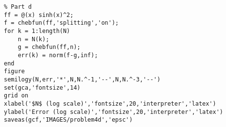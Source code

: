 \begin{solution}
\begin{verbatim}
% Part d
ff = @(x) sinh(x)^2;
f = chebfun(ff,'splitting','on');
for k = 1:length(N)
    n = N(k);
    g = chebfun(ff,n);
    err(k) = norm(f-g,inf);
end
figure
semilogy(N,err,'*',N,N.^-1,'--',N,N.^-3,'--')
set(gca,'fontsize',14)
grid on
xlabel('$N$ (log scale)','fontsize',20,'interpreter','latex')
ylabel('Error (log scale)','fontsize',20,'interpreter','latex')
saveas(gcf,'IMAGES/problem4d','epsc')
\end{verbatim}


\end{solution}
